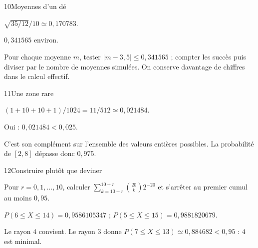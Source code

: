 \begin{corrige}{10}{Moyennes d’un dé}
\begin{questions}
\item $\sqrt{35/12}/10\simeq0{,}170783$.
\item $0{,}341565$ environ.
\item Pour chaque moyenne $m$, tester $|m-3{,}5|\leq0{,}341565$ ; compter les succès puis diviser par le nombre de moyennes simulées. On conserve davantage de chiffres dans le calcul effectif.
\end{questions}
\end{corrige}
\begin{corrige}{11}{Une zone rare}
\begin{questions}
\item $(1+10+10+1)/1024=11/512\simeq0{,}021484$.
\item Oui : $0{,}021484<0{,}025$.
\item C’est son complément sur l’ensemble des valeurs entières possibles. La probabilité de $[2,8]$ dépasse donc $0{,}975$.
\end{questions}
\end{corrige}
\begin{corrige}{12}{Construire plutôt que deviner}
\begin{questions}
\item Pour $r=0,1,\ldots,10$, calculer $\sum_{k=10-r}^{10+r}\binom{20}k2^{-20}$ et s’arrêter au premier cumul au moins $0{,}95$.
\item $P(6\leq X\leq14)=0{,}9586105347$ ; $P(5\leq X\leq15)=0{,}9881820679$.
\item Le rayon $4$ convient. Le rayon $3$ donne $P(7\leq X\leq13)\simeq0{,}884682<0{,}95$ : $4$ est minimal.
\end{questions}
\end{corrige}
